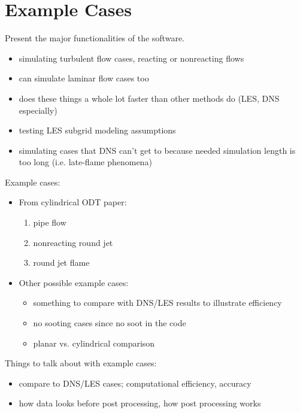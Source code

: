 \documentclass[preprint,12pt, a4paper]{elsarticle}
\begin{document}

\section{Example Cases}
\label{sec:examples}

Present the major functionalities of the software. 
\begin{itemize}
	\item simulating turbulent flow cases, reacting or nonreacting flows
	\item can simulate laminar flow cases too
	\item does these things a whole lot faster than other methods do (LES, DNS especially)
	\item testing LES subgrid modeling assumptions
	\item simulating cases that DNS can't get to because needed simulation length is too long (i.e. late-flame phenomena)
\end{itemize}

Example cases:
\begin{itemize}
	\item From cylindrical ODT paper:
	\begin{enumerate}
		\item pipe flow
		\item nonreacting round jet
		\item round jet flame
	\end{enumerate}
	\item Other possible example cases:
	\begin{itemize}
		\item something to compare with DNS/LES results to illustrate efficiency
		\item no sooting cases since no soot in the code
		\item planar vs. cylindrical comparison
	\end{itemize}
\end{itemize} 

Things to talk about with example cases:
\begin{itemize}
	\item compare to DNS/LES cases; computational efficiency, accuracy
	\item how data looks before post processing, how post processing works
\end{itemize}
\end{document}
